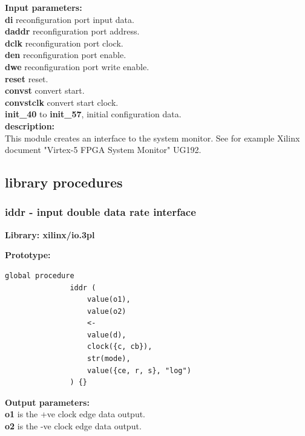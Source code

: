             {\bf Input parameters:} \\
            {\bf di} reconfiguration port input data.\\
            {\bf daddr} reconfiguration port address.\\
            {\bf dclk} reconfiguration port clock.\\
            {\bf den} reconfiguration port enable.\\
            {\bf dwe} reconfiguration port write enable.\\
            {\bf reset} reset.\\
            {\bf convst} convert start.\\
            {\bf convstclk} convert start clock.\\
            {\bf init\_40} to {\bf init\_57}, initial configuration data.\\

            {\bf description:} \\
            This module creates an interface to the system monitor. See
            for example Xilinx document "Virtex-5 FPGA System Monitor" UG192.



        
    \subsection{library procedures}



        \subsubsection{iddr - input double data rate interface}\label{sec:lpiddr}

            {\bf Library: xilinx/io.3pl}

            {\bf Prototype:} \\
            \vsp
            \begin{lstlisting}[gobble=12, language=threepl]
               global procedure
               iddr (
                   value(o1),
                   value(o2)
                   <-
                   value(d),
                   clock({c, cb}),
                   str(mode),
                   value({ce, r, s}, "log")
               ) {}
            \end{lstlisting}

            {\bf Output parameters:} \\
            {\bf o1} is the +ve clock edge data output.\\
            {\bf o2} is the -ve clock edge data output.


